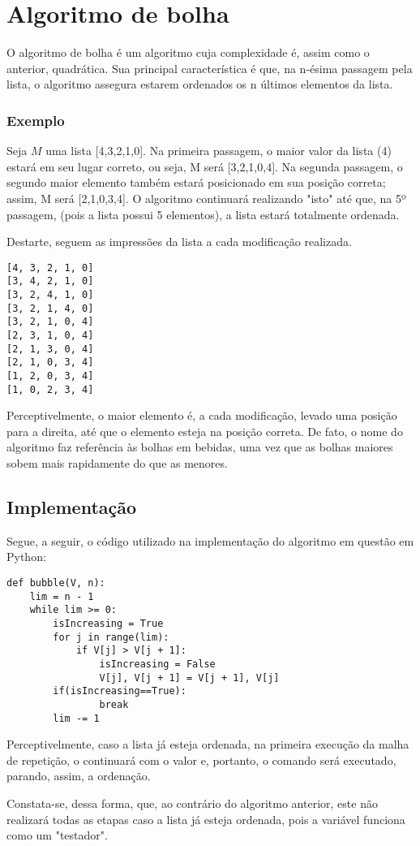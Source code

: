 \section{Algoritmo de bolha}
O algoritmo de bolha é um algoritmo cuja complexidade é, assim como o anterior, quadrática. Sua principal característica é que, na n-ésima passagem pela lista, o algoritmo assegura estarem ordenados os n últimos elementos da lista.

\subsubsection*{Exemplo}
Seja $M$ uma lista [4,3,2,1,0].
Na primeira passagem, o maior valor da lista (4) estará em seu lugar correto, ou seja, M será [3,2,1,0,4]. Na segunda passagem, o segundo maior elemento também estará posicionado em sua posição correta; assim, M será [2,1,0,3,4].
O algoritmo continuará realizando "isto" até que, na 5º passagem, (pois a lista possui 5 elementos), a lista estará totalmente ordenada.

Destarte, seguem as impressões da lista a cada modificação realizada. 

\begin{lstlisting}
[4, 3, 2, 1, 0]
[3, 4, 2, 1, 0]
[3, 2, 4, 1, 0]
[3, 2, 1, 4, 0]
[3, 2, 1, 0, 4]
[2, 3, 1, 0, 4]
[2, 1, 3, 0, 4]
[2, 1, 0, 3, 4]
[1, 2, 0, 3, 4]
[1, 0, 2, 3, 4]
\end{lstlisting}

Perceptivelmente, o maior elemento é, a cada modificação, levado uma posição para a direita, até que o elemento esteja na posição correta. De fato, o nome do algoritmo faz referência às bolhas em bebidas, uma vez que as bolhas maiores sobem mais rapidamente do que as menores.

\subsection{Implementação}
Segue, a seguir, o código utilizado na implementação do algoritmo em questão em Python:

\begin{lstlisting}
def bubble(V, n):
    lim = n - 1
    while lim >= 0:
        isIncreasing = True
        for j in range(lim):
            if V[j] > V[j + 1]:
                isIncreasing = False
                V[j], V[j + 1] = V[j + 1], V[j]
        if(isIncreasing==True): 
                break
        lim -= 1
\end{lstlisting}


Perceptivelmente, caso a lista já esteja ordenada, na primeira execução da malha de repetição, o  continuará com o valor  e, portanto, o comando  será executado, parando, assim, a ordenação.

Constata-se, dessa forma, que, ao contrário do algoritmo anterior, este não realizará todas as etapas caso a lista já esteja ordenada, pois a variável  funciona como um "testador".